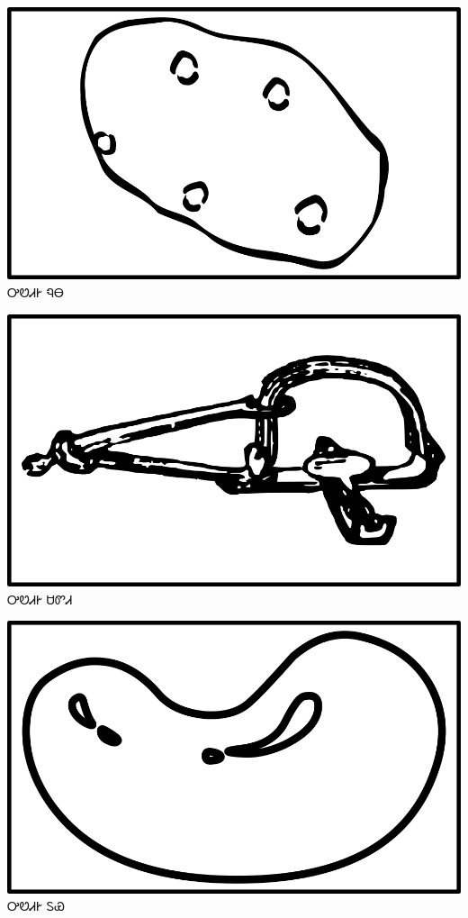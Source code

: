 \documentclass[avery5371]{flashcards}%
\begin{document}
    \begin{flashcard}{
        \includegraphics[width=0.95\columnwidth,height=.51\columnwidth,keepaspectratio]{../artwork/objects-neutral/nuna}
    }
        \Huge ᎤᏬᏗᎨ ᏄᎾ
    \end{flashcard}

    \begin{flashcard}{
        \includegraphics[width=0.95\columnwidth,height=.51\columnwidth,keepaspectratio]{../artwork/objects-neutral/sadvdi}
    }
        \Huge ᎤᏬᏗᎨ ᏌᏛᏗ
    \end{flashcard}

    \begin{flashcard}{
        \includegraphics[width=0.95\columnwidth,height=.51\columnwidth,keepaspectratio]{../artwork/objects-neutral/tuya}
    }
        \Huge ᎤᏬᏗᎨ ᏚᏯ
    \end{flashcard}
\end{document}
